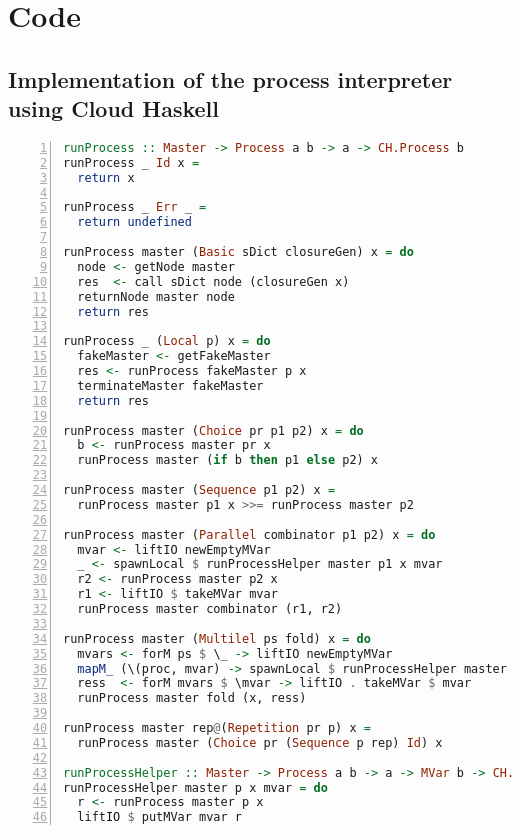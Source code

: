 \chapter{Code}

\clearpage

\section{Implementation of the process interpreter using Cloud Haskell}
\label{app:distributed_split_slice}
\begin{lstlisting}[language=Haskell,frame=tb,numbers=left,caption=Implementation of \texttt{runProcess} using \textsf{Cloud Haskell}.]
runProcess :: Master -> Process a b -> a -> CH.Process b
runProcess _ Id x =
  return x

runProcess _ Err _ =
  return undefined

runProcess master (Basic sDict closureGen) x = do
  node <- getNode master
  res  <- call sDict node (closureGen x)
  returnNode master node
  return res

runProcess _ (Local p) x = do
  fakeMaster <- getFakeMaster
  res <- runProcess fakeMaster p x
  terminateMaster fakeMaster
  return res

runProcess master (Choice pr p1 p2) x = do
  b <- runProcess master pr x
  runProcess master (if b then p1 else p2) x

runProcess master (Sequence p1 p2) x =
  runProcess master p1 x >>= runProcess master p2

runProcess master (Parallel combinator p1 p2) x = do
  mvar <- liftIO newEmptyMVar
  _ <- spawnLocal $ runProcessHelper master p1 x mvar
  r2 <- runProcess master p2 x
  r1 <- liftIO $ takeMVar mvar
  runProcess master combinator (r1, r2)

runProcess master (Multilel ps fold) x = do
  mvars <- forM ps $ \_ -> liftIO newEmptyMVar
  mapM_ (\(proc, mvar) -> spawnLocal $ runProcessHelper master proc x mvar) (ps `zip` mvars)
  ress  <- forM mvars $ \mvar -> liftIO . takeMVar $ mvar
  runProcess master fold (x, ress)

runProcess master rep@(Repetition pr p) x =
  runProcess master (Choice pr (Sequence p rep) Id) x

runProcessHelper :: Master -> Process a b -> a -> MVar b -> CH.Process ()
runProcessHelper master p x mvar = do
  r <- runProcess master p x
  liftIO $ putMVar mvar r
\end{lstlisting}

